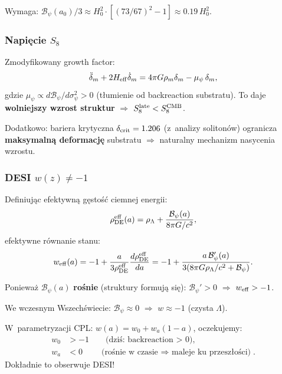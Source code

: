 Wymaga: $\mathcal{B}_\psi(a_0)/3 \approx H_0^2 \cdot [(73/67)^2 - 1] \approx 0.19\,H_0^2$.

\subsubsection{Napi\k{e}cie $S_8$}

Zmodyfikowany growth factor:
\begin{equation}
  \ddot\delta_m + 2H_{\rm eff}\dot\delta_m
  = 4\pi G\rho_m\delta_m - \mu_\psi\,\delta_m,
  \label{eq:CT1-growth}
\end{equation}
gdzie $\mu_\psi \propto d\mathcal{B}_\psi/d\sigma_\psi^2 > 0$ (t\l{}umienie
od backreaction substratu). To daje \textbf{wolniejszy wzrost struktur}
$\Rightarrow$ $S_8^{\rm late} < S_8^{\rm CMB}$.

Dodatkowo: bariera krytyczna $\delta_{\rm crit} = 1.206$ (z~analizy soliton\'ow)
ogranicza \textbf{maksymaln\k{a} deformacj\k{e}} substratu
$\Rightarrow$ naturalny mechanizm nasycenia wzrostu.

\subsubsection{DESI $w(z) \neq -1$}

Definiuj\k{a}c efektywn\k{a} g\k{e}sto\'s\'c ciemnej energii:
\begin{equation}
  \rho_{\rm DE}^{\rm eff}(a) = \rho_\Lambda + \frac{\mathcal{B}_\psi(a)}{8\pi G/c^2},
\end{equation}
efektywne r\'ownanie stanu:
\begin{equation}
  w_{\rm eff}(a) = -1 + \frac{a}{3\rho_{\rm DE}^{\rm eff}}
  \frac{d\rho_{\rm DE}^{\rm eff}}{da}
  = -1 + \frac{a\,\mathcal{B}_\psi'(a)}{3(8\pi G\rho_\Lambda/c^2 + \mathcal{B}_\psi)}.
  \label{eq:CT1-w-eff}
\end{equation}

Poniewa\.z $\mathcal{B}_\psi(a)$ \textbf{ro\'snie} (struktury formuj\k{a} si\k{e}):
$\mathcal{B}_\psi' > 0$ $\Rightarrow$ $w_{\rm eff} > -1$.

We wczesnym Wszech\'swiecie: $\mathcal{B}_\psi \approx 0$
$\Rightarrow$ $w \approx -1$ (czysta $\Lambda$).

W~parametryzacji CPL: $w(a) = w_0 + w_a(1-a)$, oczekujemy:
\begin{align}
  w_0 &> -1 \qquad \text{(dzi\'s: backreaction > 0)}, \\
  w_a &< 0 \qquad \text{(ro\'snie w~czasie $\Rightarrow$ maleje ku przesz\l{}o\'sci)}.
\end{align}
Dok\l{}adnie to obserwuje DESI!


